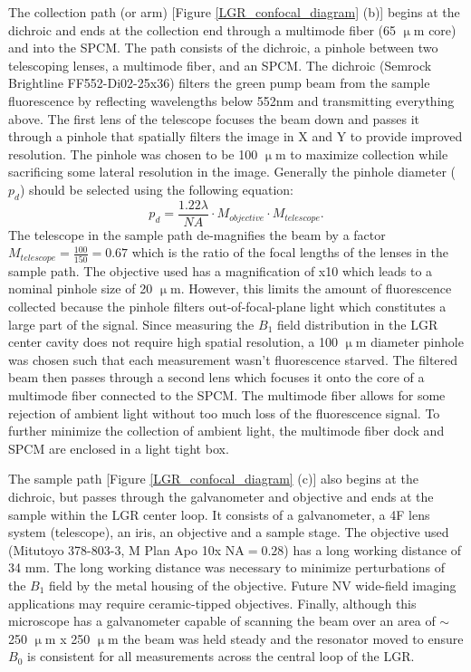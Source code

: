 The collection path (or arm) [Figure \ref{LGR_confocal_diagram} (b)] begins at the dichroic and ends at the collection end through a multimode fiber (65 $\upmu$m core) and into the SPCM. The path consists of the dichroic, a pinhole between two telescoping lenses, a multimode fiber, and an SPCM. The dichroic (Semrock Brightline FF552-Di02-25x36) filters the green pump beam from the sample fluorescence by reflecting wavelengths below 552nm and transmitting everything above. The first lens of the telescope focuses the beam down and passes it through a pinhole that spatially filters the image in X and Y to provide improved resolution. The pinhole was chosen to be 100 $\upmu$m to maximize collection while sacrificing some lateral resolution in the image. Generally the pinhole diameter ($p_d$) should be selected using the following equation:
\begin{equation}
p_d = \frac{1.22 \lambda}{NA} \cdot M_{objective} \cdot M_{telescope}. 
\end{equation}
The telescope in the sample path de-magnifies the beam by a factor $M_{telescope} = \frac{100}{150} = 0.67$ which is the ratio of the focal lengths of the lenses in the sample path. The objective used has a magnification of x10 which leads to a nominal pinhole size of 20 $\upmu$m. However, this limits the amount of fluorescence collected because the pinhole filters out-of-focal-plane light which constitutes a large part of the signal. Since measuring the $B_1$ field distribution in the LGR center cavity does not require high spatial resolution, a 100 $\upmu$m diameter pinhole was chosen such that each measurement wasn't fluorescence starved. The filtered beam then passes through a second lens which focuses it onto the core of a multimode fiber connected to the SPCM. The multimode fiber allows for some rejection of ambient light without too much loss of the fluorescence signal. To further minimize the collection of ambient light, the multimode fiber dock and SPCM are enclosed in a light tight box. 

The sample path [Figure \ref{LGR_confocal_diagram} (c)] also begins at the dichroic, but passes through the galvanometer and objective and ends at the sample within the LGR center loop. It consists of a galvanometer, a 4F lens system (telescope), an iris, an objective and a sample stage. The objective used (Mitutoyo 378-803-3, M Plan Apo 10x $\text{NA}=0.28$) has a long working distance of 34 mm. The long working distance was necessary to minimize perturbations of the $B_1$ field by the metal housing of the objective. Future NV wide-field imaging applications may require ceramic-tipped objectives. Finally, although this microscope has a galvanometer capable of scanning the beam over an area of $\sim$ 250 $\upmu$m x 250 $\upmu$m the beam was held steady and the resonator moved to ensure $B_0$ is consistent for all measurements across the central loop of the LGR.


